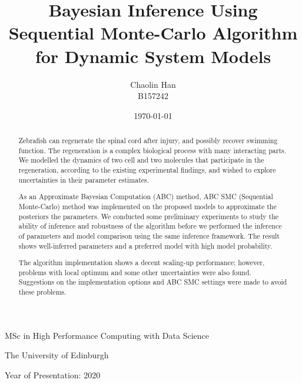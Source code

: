 \documentclass[12pt,a4paper]{report}
\begin{document}

\title{Bayesian Inference Using Sequential Monte-Carlo Algorithm for Dynamic System Models}

\author{Chaolin Han\\B157242}

\date{\today}

\makeEPCCtitle

\thispagestyle{empty}

\vspace{11cm}

\begin{center}

    \large{MSc in High Performance Computing with Data Science}

    \large{The University of Edinburgh}

    \large{Year of Presentation: 2020}

\end{center}

\newpage

\begin{abstract}
    Zebrafish can regenerate the spinal cord after injury, and possibly recover swimming function. The regeneration is a complex biological process with many interacting parts. We modelled the dynamics of two cell and two molecules that participate in the regeneration, according to the existing experimental findings\cite{ref:Tsarouchas}, and wished to explore uncertainties in their parameter estimates.
    
    As an Approximate Bayesian Computation (ABC) method, ABC SMC (Sequential Monte-Carlo) method was implemented on the proposed models to approximate the posteriors the parameters. We conducted some preliminary experiments to study the ability of inference and robustness of the algorithm before we performed the inference of parameters and model comparison using the same inference framework. The result shows well-inferred parameters and a preferred model with high model probability.

    The algorithm implementation shows a decent scaling-up performance; however, problems with local optimum and some other uncertainties were also found. Suggestions on the implementation options and ABC SMC settings were made to avoid these problems.
\end{abstract}


\tableofcontents
\listoftables
\listoffigures
\end{document}
